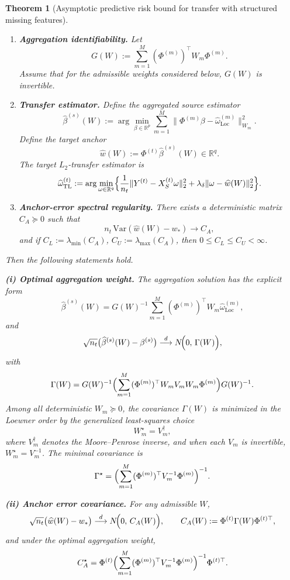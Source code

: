 \documentclass[11pt]{article}
\newcommand{\1}{\mathbf{1}}
\newtheorem{theorem}{Theorem}
\begin{document}
\begin{theorem}[Asymptotic predictive risk bound for transfer with structured missing features]
\begin{enumerate}
\item[(A6)] \textbf{Aggregation identifiability.}
Let
\[
G(W):=\sum_{m=1}^M (\Phi^{(m)})^\top W_m \Phi^{(m)}.
\]
Assume that for the admissible weights considered below, \(G(W)\) is invertible.

\item[(A7)] \textbf{Transfer estimator.}
Define the aggregated source estimator
\[
\widehat\beta^{(s)}(W)
:=\arg\min_{\beta\in\mathbb R^p}
\sum_{m=1}^M \bigl\|\Phi^{(m)}\beta-\widehat\omega_{\mathrm{Loc}}^{(m)}\bigr\|_{W_m}^2.
\]
Define the target anchor
\[
\widehat w(W):=\Phi^{(t)}\widehat\beta^{(s)}(W)\in\mathbb R^q.
\]
The target \(L_2\)-transfer estimator is
\[
\widehat\omega_{\mathrm{TL}}^{(t)}
:=\arg\min_{\omega\in\mathbb R^q}
\Bigl\{\frac1{n_t}\|Y^{(t)}-X_S^{(t)}\omega\|_2^2
+\lambda_\delta\|\omega-\widehat w(W)\|_2^2\Bigr\}.
\]

\item[(A8)] \textbf{Anchor-error spectral regularity.}
There exists a deterministic matrix \(C_A\succeq 0\) such that
\[
n_t\,\mathrm{Var}\!\left(\widehat w(W)-w_*\right)\to C_A,
\]
and if \(C_L:=\lambda_{\min}(C_A)\), \(C_U:=\lambda_{\max}(C_A)\), then
\(0\le C_L\le C_U<\infty\).
\end{enumerate}

Then the following statements hold.

\medskip
\noindent\textbf{(i) Optimal aggregation weight.}
The aggregation solution has the explicit form
\[
\widehat\beta^{(s)}(W)=G(W)^{-1}\sum_{m=1}^M (\Phi^{(m)})^\top W_m\widehat\omega_{\mathrm{Loc}}^{(m)},
\]
and
\[
\sqrt{n_t}\bigl(\widehat\beta^{(s)}(W)-\beta^{(s)}\bigr)
\overset{d}{\longrightarrow}
N\!\Bigl(0,\,
\Gamma(W)\Bigr),
\]
with
\[
\Gamma(W)
=
G(W)^{-1}
\Bigl(\sum_{m=1}^M (\Phi^{(m)})^\top W_m V_m W_m \Phi^{(m)}\Bigr)
G(W)^{-1}.
\]
Among all deterministic \(W_m\succeq 0\), the covariance \(\Gamma(W)\) is minimized
in the Loewner order by the generalized least-squares choice
\[
W_m^\star = V_m^{\dagger},
\]
where \(V_m^\dagger\) denotes the Moore--Penrose inverse, and when each \(V_m\) is invertible,
\(W_m^\star=V_m^{-1}\). The minimal covariance is
\[
\Gamma^\star
=
\Bigl(\sum_{m=1}^M (\Phi^{(m)})^\top V_m^{-1}\Phi^{(m)}\Bigr)^{-1}.
\]

\medskip
\noindent\textbf{(ii) Anchor error covariance.}
For any admissible \(W\),
\[
\sqrt{n_t}\bigl(\widehat w(W)-w_*\bigr)
\overset{d}{\longrightarrow}
N\!\Bigl(0,\,
C_A(W)\Bigr),
\qquad
C_A(W):=\Phi^{(t)}\Gamma(W)\Phi^{(t)\top},
\]
and under the optimal aggregation weight,
\[
C_A^\star
=
\Phi^{(t)}
\Bigl(\sum_{m=1}^M (\Phi^{(m)})^\top V_m^{-1}\Phi^{(m)}\Bigr)^{-1}
\Phi^{(t)\top}.
\]


\end{theorem}
\end{document}
